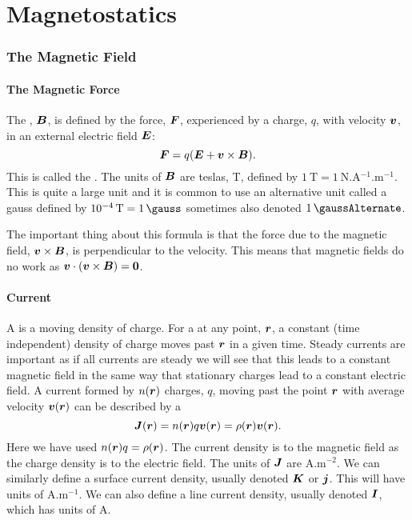 \part{Magnetostatics}
    \section{The Magnetic Field}
    \subsection{The Magnetic Force}
    The , \(\bm{B}\), is defined by the force, \(\bm{F}\), experienced by a charge, \(q\), with velocity \(\bm{v}\), in an external electric field \(\bm{E}\):
    \[\bm{F} = q(\bm{E} + \bm{v}\times\bm{B}).\]
    This is called the .
    The units of \(\bm{B}\) are teslas, \si{\tesla}, defined by \(\SI{1}{\tesla} = \SI{1}{\newton.\ampere^{-1}.\metre^{-1}}\).
    This is quite a large unit and it is common to use an alternative unit called a gauss defined by \(\SI{e-4}{\tesla} = \SI{1}{\gauss}\) sometimes also denoted \(\SI{1}{\gaussAlternate}\).
    
    The important thing about this formula is that the force due to the magnetic field, \(\bm{v}\times\bm{B}\), is perpendicular to the velocity.
    This means that magnetic fields do no work as \(\bm{v}\cdot(\bm{v}\times\bm{B}) = \bm{0}\).
    
    \subsection{Current}
    A  is a moving density of charge.
    For a  at any point, \(\bm{r}\), a constant (time independent) density of charge moves past \(\bm{r}\) in a given time.
    Steady currents are important as if all currents are steady we will see that this leads to a constant magnetic field in the same way that stationary charges lead to a constant electric field.
    A current formed by \(n(\bm{r})\) charges, \(q\), moving past the point \(\bm{r}\) with average velocity \(\bm{v}(\bm{r})\) can be described by a 
    \[\bm{J}(\bm{r}) = n(\bm{r})q\bm{v}(\bm{r}) = \rho(\bm{r})\bm{v}(\bm{r}).\]
    Here we have used \(n(\bm{r})q = \rho(\bm{r})\).
    The current density is to the magnetic field as the charge density is to the electric field.
    The units of \(\bm{J}\) are \(\si{\ampere.\metre^{-2}}\).
    We can similarly define a surface current density, usually denoted \(\bm{K}\) or \(\bm{j}\).
    This will have units of \(\si{\ampere.\metre^{-1}}\).
    We can also define a line current density, usually denoted \(\bm{I}\), which has units of \(\si{\ampere}\).
    
